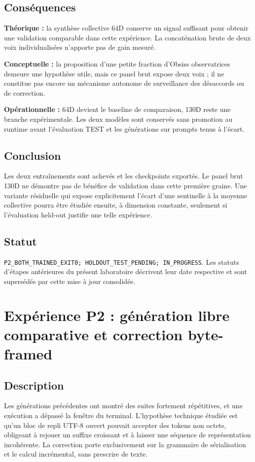 \documentclass[11pt,a4paper]{report}
\begin{document}
\section{Conséquences}
\textbf{Théorique :} la synthèse collective 64D conserve un signal suffisant pour obtenir une validation comparable dans cette expérience. La concaténation brute de deux voix individualisées n'apporte pas de gain mesuré.\par
\textbf{Conceptuelle :} la proposition d'une petite fraction d'Obsiss observatrices demeure une hypothèse utile, mais ce panel brut expose deux voix ; il ne constitue pas encore un mécanisme autonome de surveillance des désaccords ou de correction.\par
\textbf{Opérationnelle :} 64D devient le baseline de comparaison, 130D reste une branche expérimentale. Les deux modèles sont conservés sans promotion au runtime avant l'évaluation TEST et les générations sur prompts tenus à l'écart.
\section{Conclusion}
Les deux entraînements sont achevés et les checkpoints exportés. Le panel brut 130D ne démontre pas de bénéfice de validation dans cette première graine. Une variante résiduelle qui expose explicitement l'écart d'une sentinelle à la moyenne collective pourra être étudiée ensuite, à dimension constante, seulement si l'évaluation held-out justifie une telle expérience.
\section{Statut}
\texttt{P2\_BOTH\_TRAINED\_EXIT0; HOLDOUT\_TEST\_PENDING; IN\_PROGRESS}. Les statuts d'étapes antérieures du présent laboratoire décrivent leur date respective et sont supersédés par cette mise à jour consolidée.

\chapter{Expérience P2 : génération libre comparative et correction byte-framed}
\label{lab:p2-byte-framed}
\section{Description}
Les générations précédentes ont montré des suites fortement répétitives, et une exécution a dépassé la fenêtre du terminal. L'hypothèse technique étudiée est qu'un bloc de repli UTF-8 ouvert pouvait accepter des tokens non octets, obligeant à rejouer un suffixe croissant et à laisser une séquence de représentation incohérente. La correction porte exclusivement sur la grammaire de sérialisation et le calcul incrémental, sans prescrire de texte.
\end{document}
